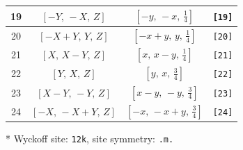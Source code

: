 \documentclass[fleqn,8pt]{jsarticle}
\begin{document}
\begin{longtable}{cccc}
19 & $\left[ - Y,\, - X,\, Z \right]$ & $\left[ - y,\, - x,\, \frac{1}{4} \right]$ & {\tt [19]} \\ \hline
20 & $\left[ - X + Y,\, Y,\, Z \right]$ & $\left[ - x + y,\, y,\, \frac{1}{4} \right]$ & {\tt [20]} \\ \hline
21 & $\left[ X,\, X - Y,\, Z \right]$ & $\left[ x,\, x - y,\, \frac{1}{4} \right]$ & {\tt [21]} \\ \hline
22 & $\left[ Y,\, X,\, Z \right]$ & $\left[ y,\, x,\, \frac{3}{4} \right]$ & {\tt [22]} \\ \hline
23 & $\left[ X - Y,\, - Y,\, Z \right]$ & $\left[ x - y,\, - y,\, \frac{3}{4} \right]$ & {\tt [23]} \\ \hline
24 & $\left[ - X,\, - X + Y,\, Z \right]$ & $\left[ - x,\, - x + y,\, \frac{3}{4} \right]$ & {\tt [24]} \\
\end{longtable}
* Wyckoff site: {\tt 12k}, site symmetry: {\tt .m.}
\renewcommand{\arraystretch}{1.2}
\end{document}
